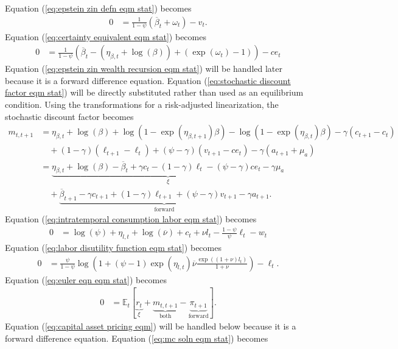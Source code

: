 \documentclass[12 pt, oneside]{article}
\theoremstyle{definition}
\theoremstyle{definition}
\theoremstyle{definition}
\newcommand{\E}{\mathbb{E}}
\begin{document}
Equation (\ref{eq:epstein zin defn eqm stat}) becomes
\begin{align*}
  0 & = \frac{1}{1 - \psi}(\overline{\beta}_t + \omega_t) - v_t.
\end{align*}
Equation (\ref{eq:certainty equivalent eqm stat}) becomes
\begin{align*}
  0 & = \frac{1}{1 - \psi}(\overline{\beta}_t - (\eta_{\beta, t} + \log(\beta)) + (\exp(\omega_t) - 1)) - ce_t
\end{align*}
Equation (\ref{eq:epstein zin wealth recursion eqm stat}) will be handled later because it is a forward difference equation. Equation (\ref{eq:stochastic discount factor eqm stat}) will be directly substituted rather than used as an equilibrium condition. Using the transformations for a risk-adjusted linearization, the stochastic discount factor becomes
\begin{align*}
  m_{t, t + 1} & = \eta_{\beta, t} + \log(\beta)  + \log(1 - \exp(\eta_{\beta, t + 1})\beta) - \log(1 - \exp(\eta_{\beta, t}) \beta) - \gamma (c_{t + 1} - c_t) \\
               &\quad + (1 - \gamma)(\ell_{t + 1} - \ell_t) + (\psi - \gamma)(v_{t + 1} - ce_t) - \gamma(a_{t + 1} + \mu_a)\\
               & = \underbrace{\eta_{\beta, t} + \log(\beta) - \overline{\beta}_t + \gamma c_t - (1 - \gamma) \ell_t - (\psi - \gamma) ce_t - \gamma \mu_a}_{\xi} \\
               &\quad + \underbrace{\overline{\beta}_{t + 1} - \gamma c_{t + 1} + (1 - \gamma) \ell_{t + 1} + (\psi - \gamma) v_{t + 1} - \gamma a_{t + 1}}_{\text{forward}}.
\end{align*}
Equation (\ref{eq:intratemporal consumption labor eqm stat}) becomes
\begin{align*}
  0 & = \log(\psi) + \eta_{l, t} + \log(\overline{\nu}) + c_t + \nu l_t - \frac{1 - \psi}{\psi}\ell_t - w_t
\end{align*}
Equation (\ref{eq:labor disutility function eqm stat}) becomes
\begin{align*}
  0 & = \frac{\psi}{1 - \psi}\log\left(1 + (\psi - 1)\exp(\eta_{l, t})\overline{\nu}\frac{\exp((1 + \nu)l_t)}{1 + \nu}\right) - \ell_t.
\end{align*}
Equation (\ref{eq:euler eqn eqm stat}) becomes
\begin{align*}
  0 & = \E_t\left[\underbrace{r_t}_{\xi} + \underbrace{m_{t, t + 1}}_{\text{both}} - \underbrace{\pi_{t + 1}}_{\text{forward}}\right].
\end{align*}
Equation (\ref{eq:capital asset pricing eqm}) will be handled below because it is a forward difference equation. Equation (\ref{eq:mc soln eqm stat}) becomes
\end{document}
